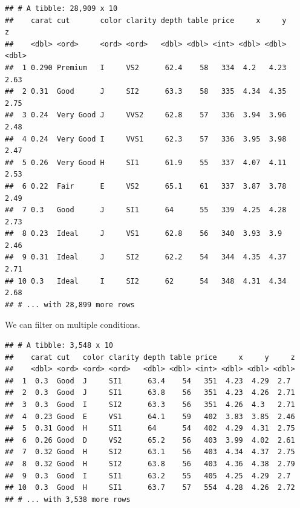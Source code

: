 \documentclass[
]{book}
\newenvironment{Shaded}{\begin{snugshade}}{\end{snugshade}}
\newcommand{\DecValTok}[1]{\textcolor[rgb]{0.00,0.00,0.81}{#1}}
\newcommand{\KeywordTok}[1]{\textcolor[rgb]{0.13,0.29,0.53}{\textbf{#1}}}
\newcommand{\NormalTok}[1]{#1}
\newcommand{\OperatorTok}[1]{\textcolor[rgb]{0.81,0.36,0.00}{\textbf{#1}}}
\newcommand{\StringTok}[1]{\textcolor[rgb]{0.31,0.60,0.02}{#1}}
\begin{document}
\begin{verbatim}
## # A tibble: 28,909 x 10
##    carat cut       color clarity depth table price     x     y     z
##    <dbl> <ord>     <ord> <ord>   <dbl> <dbl> <int> <dbl> <dbl> <dbl>
##  1 0.290 Premium   I     VS2      62.4    58   334  4.2   4.23  2.63
##  2 0.31  Good      J     SI2      63.3    58   335  4.34  4.35  2.75
##  3 0.24  Very Good J     VVS2     62.8    57   336  3.94  3.96  2.48
##  4 0.24  Very Good I     VVS1     62.3    57   336  3.95  3.98  2.47
##  5 0.26  Very Good H     SI1      61.9    55   337  4.07  4.11  2.53
##  6 0.22  Fair      E     VS2      65.1    61   337  3.87  3.78  2.49
##  7 0.3   Good      J     SI1      64      55   339  4.25  4.28  2.73
##  8 0.23  Ideal     J     VS1      62.8    56   340  3.93  3.9   2.46
##  9 0.31  Ideal     J     SI2      62.2    54   344  4.35  4.37  2.71
## 10 0.3   Ideal     I     SI2      62      54   348  4.31  4.34  2.68
## # ... with 28,899 more rows
\end{verbatim}

We can filter on multiple conditions.

\begin{Shaded}
\end{Shaded}

\begin{verbatim}
## # A tibble: 3,548 x 10
##    carat cut   color clarity depth table price     x     y     z
##    <dbl> <ord> <ord> <ord>   <dbl> <dbl> <int> <dbl> <dbl> <dbl>
##  1  0.3  Good  J     SI1      63.4    54   351  4.23  4.29  2.7 
##  2  0.3  Good  J     SI1      63.8    56   351  4.23  4.26  2.71
##  3  0.3  Good  I     SI2      63.3    56   351  4.26  4.3   2.71
##  4  0.23 Good  E     VS1      64.1    59   402  3.83  3.85  2.46
##  5  0.31 Good  H     SI1      64      54   402  4.29  4.31  2.75
##  6  0.26 Good  D     VS2      65.2    56   403  3.99  4.02  2.61
##  7  0.32 Good  H     SI2      63.1    56   403  4.34  4.37  2.75
##  8  0.32 Good  H     SI2      63.8    56   403  4.36  4.38  2.79
##  9  0.3  Good  I     SI1      63.2    55   405  4.25  4.29  2.7 
## 10  0.3  Good  H     SI1      63.7    57   554  4.28  4.26  2.72
## # ... with 3,538 more rows
\end{verbatim}
\end{document}
